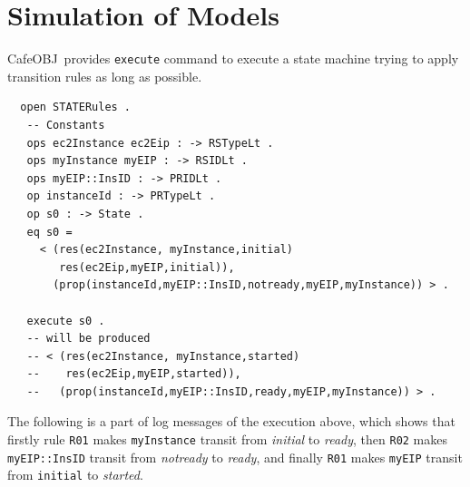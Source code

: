 \documentclass[12pt]{report}
\newcommand{\cafeobj}{{\sf CafeOBJ}~}
\begin{document}
\section{Simulation of Models}
\label{sec:simulation}
\cafeobj provides {\tt execute} command to execute a state machine
trying to apply transition rules as long as possible.
\begin{verbatim}
  open STATERules .
   -- Constants
   ops ec2Instance ec2Eip : -> RSTypeLt .
   ops myInstance myEIP : -> RSIDLt .
   ops myEIP::InsID : -> PRIDLt .
   op instanceId : -> PRTypeLt .
   op s0 : -> State .
   eq s0 =
     < (res(ec2Instance, myInstance,initial)
        res(ec2Eip,myEIP,initial)),
       (prop(instanceId,myEIP::InsID,notready,myEIP,myInstance)) > .
        
   execute s0 . 
   -- will be produced 
   -- < (res(ec2Instance, myInstance,started)
   --    res(ec2Eip,myEIP,started)),
   --   (prop(instanceId,myEIP::InsID,ready,myEIP,myInstance)) > .
\end{verbatim}
The following is a part of log messages of the execution above, which
shows that firstly rule {\tt R01} makes {\tt myInstance} transit
from {\it initial} to {\it ready}, then {\tt R02} makes
{\tt myEIP::InsID} transit from {\it notready} to {\it ready}, and
finally {\tt R01} makes {\tt myEIP} transit from {\tt initial} to
{\it started}.
\end{document}
